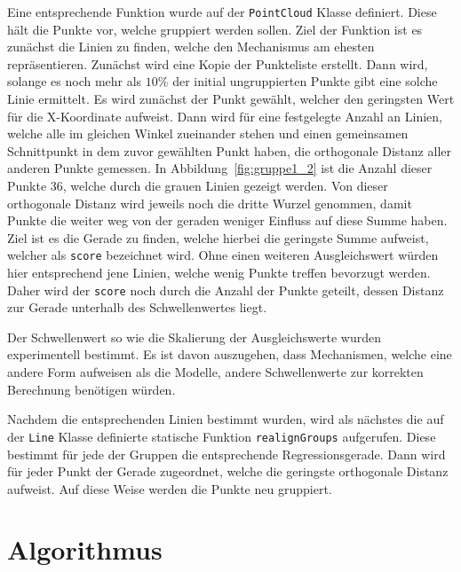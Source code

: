 Eine entsprechende Funktion wurde auf der \lstinline{PointCloud} Klasse definiert.
Diese hält die Punkte vor, welche gruppiert werden sollen.
Ziel der Funktion ist es zunächst die Linien zu finden, welche den Mechanismus am ehesten repräsentieren.
Zunächst wird eine Kopie der Punkteliste erstellt.
Dann wird, solange es noch mehr als $10\%$ der initial ungruppierten Punkte gibt eine solche Linie ermittelt.
Es wird zunächst der Punkt gewählt, welcher den geringsten Wert für die X-Koordinate aufweist.
Dann wird für eine festgelegte Anzahl an Linien, welche alle im gleichen Winkel zueinander stehen und einen gemeinsamen Schnittpunkt in dem zuvor gewählten Punkt haben, die orthogonale Distanz aller anderen Punkte gemessen.
In Abbildung~\ref{fig:gruppe1_2} ist die Anzahl dieser Punkte 36, welche durch die grauen Linien gezeigt werden.
Von dieser orthogonale Distanz wird jeweils noch die dritte Wurzel genommen, damit Punkte die weiter weg von der geraden weniger Einfluss auf diese Summe haben.
Ziel ist es die Gerade zu finden, welche hierbei die geringste Summe aufweist, welcher als \lstinline{score} bezeichnet wird.
Ohne einen weiteren Ausgleichswert würden hier entsprechend jene Linien, welche wenig Punkte treffen bevorzugt werden.
Daher wird der \lstinline{score} noch durch die Anzahl der Punkte geteilt, dessen Distanz zur Gerade unterhalb des Schwellenwertes liegt.

Der Schwellenwert so wie die Skalierung der Ausgleichswerte wurden experimentell bestimmt.
Es ist davon auszugehen, dass Mechanismen, welche eine andere Form aufweisen als die  Modelle, andere Schwellenwerte zur korrekten Berechnung benötigen würden.

Nachdem die entsprechenden Linien bestimmt wurden, wird als nächstes die auf der \lstinline{Line} Klasse definierte statische Funktion \lstinline{realignGroups} aufgerufen.
Diese bestimmt für jede der Gruppen die entsprechende Regressionsgerade.
Dann wird für jeder Punkt der Gerade zugeordnet, welche die geringste orthogonale Distanz aufweist.
Auf diese Weise werden die Punkte neu gruppiert.

\section{ Algorithmus}\label{ch:kMeans}

